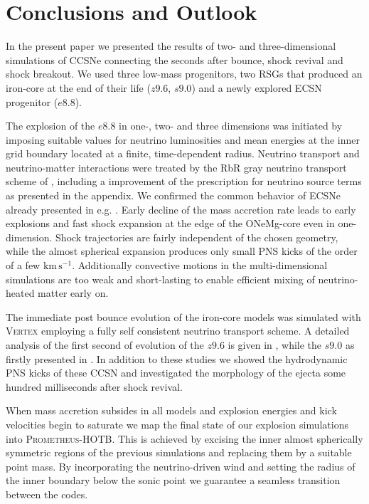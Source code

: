 \documentclass[fleqn,usenatbib]{mnras}
\newcommand{\kms}{\ensuremath{\mathrm{km\, s^{-1}}}}
\newcommand{\prom}{\textsc{Prometheus-HOTB}\xspace}
\newcommand{\vertex}{\textsc{Vertex}\xspace}
\begin{document}
\section{Conclusions and Outlook}
In the present paper we presented the results of two- and three-dimensional simulations of CCSNe connecting the seconds after bounce, shock revival and shock breakout. We used three low-mass progenitors, two RSGs that produced an iron-core at the end of their life ($z9.6$, $s9.0$) and a newly explored ECSN progenitor ($e8.8$). 

The explosion of the $e8.8$ in one-, two- and three dimensions was initiated by imposing suitable values for neutrino luminosities and mean energies at the inner grid boundary located at a finite, time-dependent radius. Neutrino transport and neutrino-matter interactions were treated by the RbR gray neutrino transport scheme of \citet{Scheck2006}, including a improvement of the prescription for neutrino source terms as presented in the appendix. We confirmed the common behavior of ECSNe already presented in e.g. \citet{Kitaura2006,Gessner2018}. Early decline of the mass accretion rate leads to early explosions and fast shock expansion at the edge of the ONeMg-core even in one-dimension. Shock trajectories are fairly independent of the chosen geometry, while the almost spherical expansion produces only small PNS kicks of the order of a few \kms. Additionally convective motions in the multi-dimensional simulations are too weak and short-lasting to enable efficient mixing of neutrino-heated matter early on.

The immediate post bounce evolution of the iron-core models was simulated with \vertex employing a fully self consistent neutrino transport scheme. A detailed analysis of the first second of evolution of the $z9.6$ is given in \citet{Melson2015a}, while the $s9.0$ as firstly presented in \citet{Melson2019}. 
In addition to these studies we showed the hydrodynamic PNS kicks of these CCSN and investigated the morphology of the ejecta some hundred milliseconds after shock revival. 

When mass accretion subsides in all models and explosion energies and kick velocities begin to saturate we map the final state of our explosion simulations into \prom. This is achieved by excising the inner almost spherically symmetric regions of the previous simulations and replacing them by a suitable point mass. By incorporating the neutrino-driven wind and setting the radius of the inner boundary below the sonic point we guarantee a seamless transition between the codes.
\end{document}
